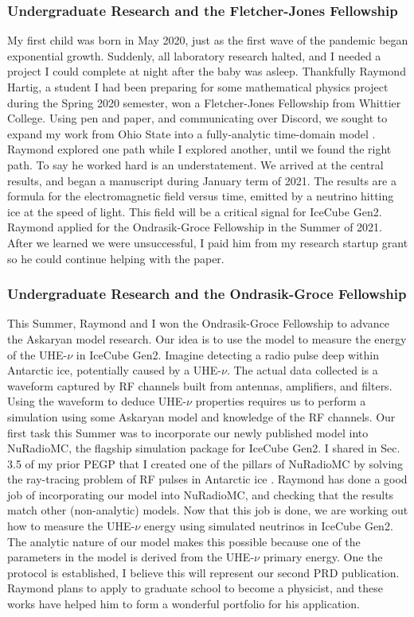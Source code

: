 \documentclass[../../../main.tex]{subfiles}
\begin{document}
\subsubsection{Undergraduate Research and the Fletcher-Jones Fellowship}

My first child was born in May 2020, just as the first wave of the pandemic began exponential growth.  Suddenly, all laboratory research halted, and I needed a project I could complete at night after the baby was asleep.  Thankfully Raymond Hartig, a student I had been preparing for some mathematical physics project during the Spring 2020 semester, won a Fletcher-Jones Fellowship from Whittier College.  Using pen and paper, and communicating over Discord, we sought to expand my work from Ohio State into a fully-analytic time-domain model \cite{10.1016/j.astropartphys.2017.03.008}.  Raymond explored one path while I explored another, until we found the right path.  To say he worked hard is an understatement.  We arrived at the central results, and began a manuscript during January term of 2021.  The results are a formula for the electromagnetic field versus time, emitted by a neutrino hitting ice at the speed of light.  This field will be a critical signal for IceCube Gen2.  Raymond applied for the Ondrasik-Groce Fellowship in the Summer of 2021.  After we learned we were unsuccessful, I paid him from my research startup grant so he could continue helping with the paper.

\subsubsection{Undergraduate Research and the Ondrasik-Groce Fellowship}

This Summer, Raymond and I won the Ondrasik-Groce Fellowship to advance the Askaryan model research.  Our idea is to use the model to measure the energy of the UHE-$\nu$ in IceCube Gen2.  Imagine detecting a radio pulse deep within Antarctic ice, potentially caused by a UHE-$\nu$.  The actual data collected is a waveform captured by RF channels built from antennas, amplifiers, and filters.  Using the waveform to deduce UHE-$\nu$ properties requires us to perform a simulation using some Askaryan model and knowledge of the RF channels.  Our first task this Summer was to incorporate our newly published model into NuRadioMC, the flagship simulation package for IceCube Gen2.  I shared in Sec. 3.5 of my prior PEGP that I created one of the pillars of NuRadioMC by solving the ray-tracing problem of RF pulses in Antarctic ice \cite{10.1140/epjc/s10052-020-7612-8} \cite{horizPaper}.  Raymond has done a good job of incorporating our model into NuRadioMC, and checking that the results match other (non-analytic) models.  Now that this job is done, we are working out how to measure the UHE-$\nu$ energy using simulated neutrinos in IceCube Gen2.  The analytic nature of our model makes this possible because one of the parameters in the model is derived from the UHE-$\nu$ primary energy.  One the protocol is established, I believe this will represent our second PRD publication.  Raymond plans to apply to graduate school to become a physicist, and these works have helped him to form a wonderful portfolio for his application.
\end{document}
